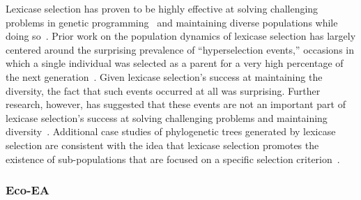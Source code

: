 Lexicase selection has proven to be highly effective at solving challenging problems in genetic programming~\cite{helmuth_general_2015,helmuth_solving_2015} and maintaining diverse populations while doing so~\cite{helmuth_effects_2016}. Prior work on the population dynamics of lexicase selection has largely centered around the surprising prevalence of ``hyperselection events,'' occasions in which a single individual was selected as a parent for a very high percentage of the next generation~\cite{mcphee_using_2016}. Given lexicase selection's success at maintaining the diversity, the fact that such events occurred at all was surprising. Further research, however, has suggested that these events are not an important part of lexicase selection's success at solving challenging problems and maintaining diversity~\cite{helmuth_impact_2016}. Additional case studies of phylogenetic trees generated by lexicase selection are consistent with the idea that lexicase selection promotes the existence of sub-populations that are focused on a specific selection criterion~\cite{mcphee_visualizing_2016}.



\subsubsection{Eco-EA}

